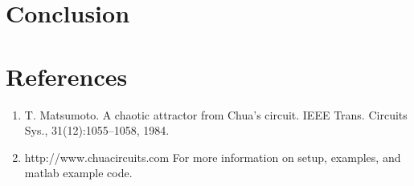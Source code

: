 \documentclass[12pt]{article}
\begin{document}
\section{Conclusion}

\section{References}
    \begin{enumerate}
        \sloppy
        \item  T. Matsumoto. A chaotic attractor from Chua’s circuit. IEEE Trans. Circuits Sys., 31(12):1055–1058, 1984.
        \item  http://www.chuacircuits.com For more information on setup, examples, and matlab example code.

    \end{enumerate}
\end{document}
